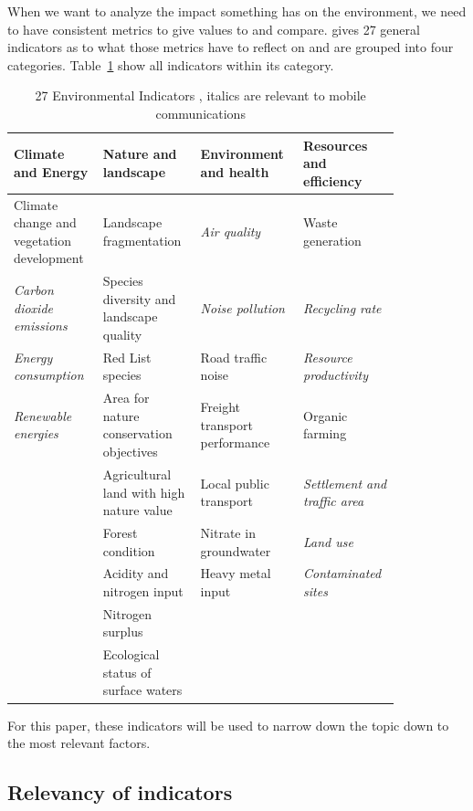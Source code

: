 \documentclass[11pt,a4paper]{article}
\begin{document}
When we want to analyze the impact something has on the environment, we need to have consistent metrics to give values to and compare.
\citep{Umweltindikatoren} gives 27 general indicators as to what those metrics have to reflect on and are grouped into four categories.
Table~\ref{tab:indicators} show all indicators within its category.

\begin{table}[t]
  \centering
  \begin{tabular}{p{0.21\linewidth}|p{0.21\linewidth}|p{0.21\linewidth}|p{0.21\linewidth}}
    \textbf{Climate and Energy} & \textbf{Nature and landscape} & \textbf{Environment and health} & \textbf{Resources and efficiency}\\
    \hline
    Climate change and vegetation development & Landscape fragmentation & \textit{Air quality} & Waste generation\\
    \hline
    \textit{Carbon dioxide emissions} & Species diversity and landscape quality & \textit{Noise pollution} & \textit{Recycling rate}\\
    \hline
    \textit{Energy consumption} & Red List species & Road traffic noise & \textit{Resource productivity}\\
    \hline
    \textit{Renewable energies} & Area for nature conservation objectives & Freight transport performance & Organic farming\\
    \hline
    & Agricultural land with high nature value & Local public transport & \textit{Settlement and traffic area}\\
    \hline
    & Forest condition & Nitrate in groundwater & \textit{Land use}\\
    \hline
    & Acidity and nitrogen input & Heavy metal input & \textit{Contaminated sites}\\
    \hline
    & Nitrogen surplus &\\
    \hline
    & Ecological status of surface waters &\\
  \end{tabular}
  \caption{27 Environmental Indicators \citep{Umweltindikatoren}, italics are relevant to mobile communications}
  \label{tab:indicators}
\end{table}

For this paper, these indicators will be used to narrow down the topic down to the most relevant factors.

\subsection{Relevancy of indicators}\label{subsec:relevancy}
\end{document}
